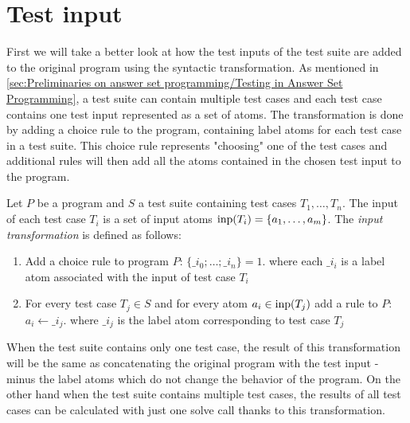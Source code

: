 \section{Test input}
\label{sec:Computing coverage metrics for propositional programs/Test input}
First we will take a better look at how the test inputs of the test suite are added to the original program using the syntactic transformation. As mentioned in \cref{sec:Preliminaries on answer set programming/Testing in Answer Set Programming}, a test suite can contain multiple test cases and each test case contains one test input represented as a set of atoms. The transformation is done by adding a choice rule to the program, containing label atoms for each test case in a test suite. This choice rule represents "choosing" one of the test cases and additional rules will then add all the atoms contained in the chosen test input to the program.

\begin{definition}
\label{def:input transforamtion}
    Let $P$ be a program and $S$ a test suite containing test cases \(T_1, \ldots, T_n\). The input of each test case $T_i$ is a set of input atoms \(\operatorname{inp}(T_i) = \{a_1, \ldots,a_m\}\). The \emph{input transformation} is defined as follows:
    \begin{enumerate}
        \item Add a choice rule to program $P$: \(\{\_i_0; \ldots;\_i_n\} = 1.\) where each $\_i_i$ is a label atom associated with the input of test case $T_i$
        \item For every test case \( T_j \in S\) and for every atom \( a_i \in \operatorname{inp}(T_j)\) add a rule to $P$: \(a_i \leftarrow \_i_j.\) where $\_i_j$ is the label atom corresponding to test case $T_j$
    \end{enumerate}
\end{definition} 

When the test suite contains only one test case, the result of this transformation will be the same as concatenating the original program with the test input - minus the label atoms which do not change the behavior of the program. On the other hand when the test suite contains multiple test cases, the results of all test cases can be calculated with just one solve call thanks to this transformation.

